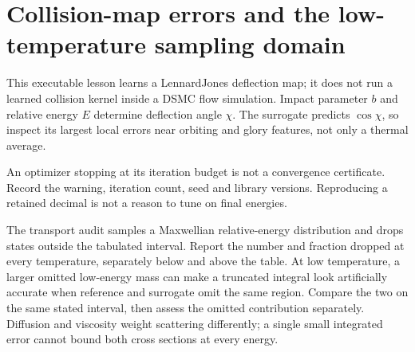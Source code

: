 \section*{Collision-map errors and the low-temperature sampling domain}
This executable lesson learns a Lennard\textendash{}Jones deflection map; it does not run a
learned collision kernel inside a DSMC flow simulation. Impact parameter $b$ and
relative energy $E$ determine deflection angle $\chi$. The surrogate predicts
$\cos\chi$, so inspect its largest local errors near orbiting and glory features,
not only a thermal average.

An optimizer stopping at its iteration budget is not a convergence certificate.
Record the warning, iteration count, seed and library versions. Reproducing a
retained decimal is not a reason to tune on final energies.

The transport audit samples a Maxwellian relative-energy distribution and drops
states outside the tabulated interval. Report the number and fraction dropped
at every temperature, separately below and above the table. At low temperature,
a larger omitted low-energy mass can make a truncated integral look artificially
accurate when reference and surrogate omit the same region. Compare the two on
the same stated interval, then assess the omitted contribution separately.
Diffusion and viscosity weight scattering differently; a single small integrated
error cannot bound both cross sections at every energy.
